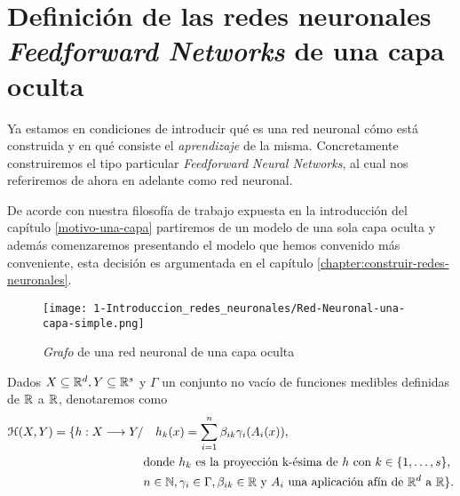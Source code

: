 %

\section{Definición de las redes neuronales \textit{Feedforward Networks} 
de una capa oculta} \label{sec:redes-neuronales-intro-una-capa}

Ya estamos en condiciones de introducir qué es una red neuronal
cómo está construida y en qué consiste el \textit{aprendizaje} de la misma. 
Concretamente
construiremos el tipo particular \textit{Feedforward Neural Networks}, al cual nos referiremos de ahora
en adelante como red neuronal.

De acorde con nuestra filosofía de trabajo expuesta en la introducción del capítulo \ref{motivo-una-capa}
partiremos de un modelo de una sola capa oculta y además comenzaremos presentando el modelo que 
hemos convenido más conveniente, esta decisión es argumentada en el capítulo \ref{chapter:construir-redes-neuronales}. 

\begin{figure}[h!]
    \centering
    \texttt{[image: 1-Introduccion\_redes\_neuronales/Red-Neuronal-una-capa-simple.png]}
    \caption{\textit{Grafo} de una red neuronal de una capa oculta}
    \label{img:grafo-red-neuronal-una-capa-oculta}
\end{figure}

    \begin{aportacionOriginal}
    \begin{definicion} \label{definition:redes_neuronales_una_capa_oculta}
        Dados $X \subseteq \mathbb{R}^d, Y \subseteq \mathbb{R}^s$ y  $\Gamma$ un conjunto no vacío de funciones medibles definidas de $\mathbb{R}$ a $\mathbb{R}$, denotaremos como 
        \begin{align}
            \mathcal{H}(X,Y) 
            =
            \{
                h : X \longrightarrow Y 
                /& \quad 
                h_k(x) = 
                \sum_{i=1}^{n} \beta_{i k} \gamma_{i}( A_{i}(x)), \\
                & \text{donde  $h_k$  es la proyección k-ésima de $h$ con 
                $k \in \{1, \ldots, s\}$}, \\
                & n \in \mathbb{N},\gamma_{i} \in \Gamma , \beta_{i k} \in \mathbb{R}
                \text{ y }A_{i} \text{ una aplicación afín de $\mathbb{R}^d$ a $\mathbb{R}$}           
            \}.
        \end{align}
    \end{definicion}
\end{aportacionOriginal}

